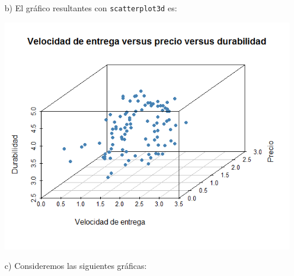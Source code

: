 \documentclass[11pt,a4paper]{article}
\begin{document}
\begin{itemize}
\begin{itemize}
\item[b)] El gráfico resultantes con \verb+scatterplot3d+ es:
\begin{center}
\includegraphics[scale=0.5]{entrega_precio_durabilidad}
\end{center}

\item[c)]Consideremos las siguientes gráficas:


\end{itemize}
\end{itemize}
\end{document}
